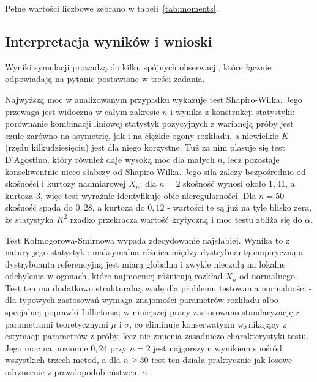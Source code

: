 \documentclass[12pt,a4paper]{article}
\begin{document}
Pełne wartości liczbowe zebrano w tabeli~\ref{tab:moments}.

\begin{table}[H]
    \centering
    \caption{Skośność i kurtoza nadmiarowa średniej $\bar{X}_n$ z rozkładu $\mathrm{Exp}(1)$: empiryczne wartości z $100\,000$ realizacji dla każdego $n$ i krzywe teoretyczne.}
    \label{tab:moments}
    
\end{table}

\subsection{Interpretacja wyników i wnioski}

Wyniki symulacji prowadzą do kilku spójnych obserwacji, które łącznie odpowiadają na pytanie postawione w treści zadania.

Najwyższą moc w analizowanym przypadku wykazuje test Shapiro-Wilka. Jego przewaga jest widoczna w całym zakresie $n$ i wynika z konstrukcji statystyki: porównanie kombinacji liniowej statystyk pozycyjnych z wariancją próby jest czułe zarówno na asymetrię, jak i na ciężkie ogony rozkładu, a niewielkie $K$ (rzędu kilkudziesięciu) jest dla niego korzystne. Tuż za nim plasuje się test D'Agostino, który również daje wysoką moc dla małych $n$, lecz pozostaje konsekwentnie nieco słabszy od Shapiro-Wilka. Jego siła zależy bezpośrednio od skośności i kurtozy nadmiarowej $\bar{X}_n$: dla $n = 2$ skośność wynosi około $1{,}41$, a kurtoza $3$, więc test wyraźnie identyfikuje obie nieregularności. Dla $n = 50$ skośność spada do $0{,}28$, a kurtoza do $0{,}12$ - wartości te są już na tyle blisko zera, że statystyka $K^2$ rzadko przekracza wartość krytyczną i moc testu zbliża się do $\alpha$.

Test Kołmogorowa-Smirnowa wypada zdecydowanie najsłabiej. Wynika to z natury jego statystyki: maksymalna różnica między dystrybuantą empiryczną a dystrybuantą referencyjną jest miarą globalną i zwykle nieczułą na lokalne odchylenia w ogonach, które najmocniej różnicują rozkład $\bar{X}_n$ od normalnego. Test ten ma dodatkowo strukturalną wadę dla problemu testowania normalności - dla typowych zastosowań wymaga znajomości parametrów rozkładu albo specjalnej poprawki Lillieforsa; w niniejszej pracy zastosowano standaryzację z parametrami teoretycznymi $\mu$ i $\sigma$, co eliminuje konserwatyzm wynikający z estymacji parametrów z próby, lecz nie zmienia zasadniczo charakterystyki testu. Jego moc na poziomie $0{,}24$ przy $n = 2$ jest najgorszym wynikiem spośród wszystkich trzech metod, a dla $n \geq 30$ test ten działa praktycznie jak losowe odrzucenie z prawdopodobieństwem $\alpha$.
\end{document}
